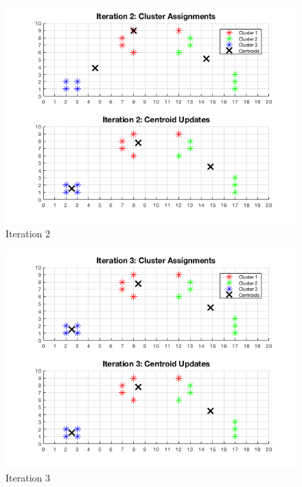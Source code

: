 \documentclass[english]{article}
\begin{document}
\begin{enumerate}
    \begin{figure}[H]
    \centering
    \includegraphics[scale = 0.85]{iter2_a}
    \caption{Iteration 2}
    \end{figure}
    
    \begin{figure}[H]
    \centering
    \includegraphics[scale = 0.85]{iter3_a}
    \caption{Iteration 3}
    \end{figure}
    

\end{enumerate}
\end{document}
